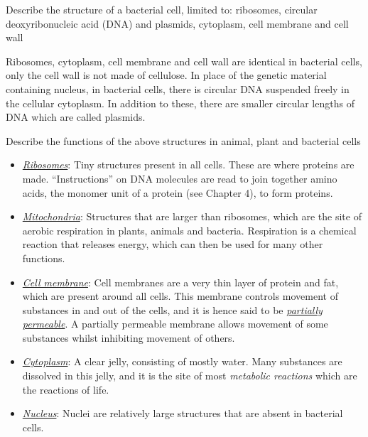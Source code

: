 \begin{point}
Describe the structure of a bacterial cell, limited to: ribosomes, circular deoxyribonucleic acid (DNA) and
plasmids, cytoplasm, cell membrane and cell wall
\end{point}

Ribosomes, cytoplasm, cell membrane and cell wall are identical in bacterial cells, only the
cell wall is not made of cellulose. In place of the genetic material containing nucleus, in
bacterial cells, there is circular DNA suspended freely in the cellular cytoplasm. In addition
to these, there are smaller circular lengths of DNA which are called plasmids.

\begin{point}
Describe the functions of the above structures in animal, plant and bacterial cells
\end{point}

\begin{itemize}
	\item \ul{\emph{Ribosomes}}: Tiny structures present in all cells. These are where proteins
		are made. ``Instructions'' on DNA molecules are read to join together amino acids, the
		monomer unit of a protein (see Chapter 4), to form proteins.
	\item \ul{\emph{Mitochondria}}: Structures that are larger than ribosomes, which are the
		site of aerobic respiration in plants, animals and bacteria. Respiration is a chemical
		reaction that releases energy, which can then be used for many other functions.
	\item \ul{\emph{Cell membrane}}: Cell membranes are a very thin layer of protein and fat,
		which are present around all cells. This membrane controls movement of substances in
		and out of the cells, and it is hence said to be \ul{\emph{partially permeable}}.
		A partially permeable membrane allows movement of some substances whilst inhibiting 
		movement of others.
	\item \ul{\emph{Cytoplasm}}: A clear jelly, consisting of mostly water. Many substances
		are dissolved in this jelly, and it is the site of most \emph{metabolic reactions}
		which are the reactions of life.
	\item \ul{\emph{Nucleus}}: Nuclei are relatively large structures that are absent in
		bacterial cells.
\end{itemize}
